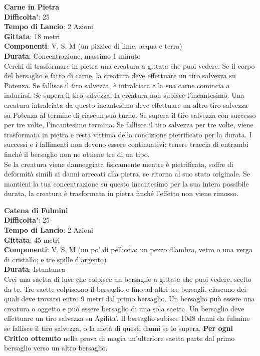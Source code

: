 \begin{multicols}{2}
\medskip\textbf{Carne in Pietra}\\
\textbf{Difficolta'}: 25\\
\textbf{Tempo di Lancio}: 2 Azioni\\
\textbf{Gittata}: 18 metri\\
\textbf{Componenti}: V, S, M (un pizzico di lime, acqua e terra)\\
\textbf{Durata}: Concentrazione, massimo 1 minuto\\
Cerchi di trasformare in pietra una creatura a gittata che puoi vedere. Se il corpo del bersaglio è fatto di carne, la creatura deve effettuare un tiro salvezza su Potenza. Se fallisce il tiro salvezza, è intralciata e la sua carne comincia a indurirsi. Se supera il tiro salvezza, la creatura non subisce l’incantesimo. Una creatura intralciata da questo incantesimo deve effettuare un altro tiro salvezza su Potenza al termine di ciascun suo turno. Se supera il tiro salvezza con successo per tre volte, l’incantesimo termina. Se fallisce il tiro salvezza per tre volte, viene trasformata in pietra e resta vittima della condizione pietrificato per la durata. I successi e i fallimenti non devono essere continuativi; tenere traccia di entrambi finché il bersaglio non ne ottiene tre di un tipo.\\
Se la creatura viene danneggiata fisicamente mentre è pietrificata, soffre di deformità simili ai danni arrecati alla pietra, se ritorna al suo stato originale. Se mantieni la tua concentrazione su questo incantesimo per la sua intera possibile durata, la creatura è trasformata in pietra finché l’effetto non viene rimosso.


\medskip\textbf{Catena di Fulmini}\\
\textbf{Difficolta'}: 25\\
\textbf{Tempo di Lancio}: 2 Azioni\\
\textbf{Gittata}: 45 metri\\
\textbf{Componenti}: V, S, M (un po’ di pelliccia; un pezzo d’ambra, vetro o una verga di cristallo; e tre spille d’argento)\\
\textbf{Durata}: Istantanea\\
Crei una saetta di luce che colpisce un bersaglio a gittata che puoi vedere, scelto da te. Tre saette colpiscono il bersaglio e fino ad altri tre bersagli, ciascuno dei quali deve trovarsi entro 9 metri dal primo bersaglio. Un bersaglio può essere una creatura o oggetto e può essere bersaglio di una sola saetta. Un bersaglio deve effettuare un tiro salvezza su Agilita'. Il bersaglio subisce 10d8 danni da fulmine se fallisce il tiro salvezza, o la metà di questi danni se lo supera.
\textbf{Per ogni Critico ottenuto} nella prova di magia un'ulteriore saetta parte dal primo bersaglio verso un altro bersaglio.


\end{multicols}
